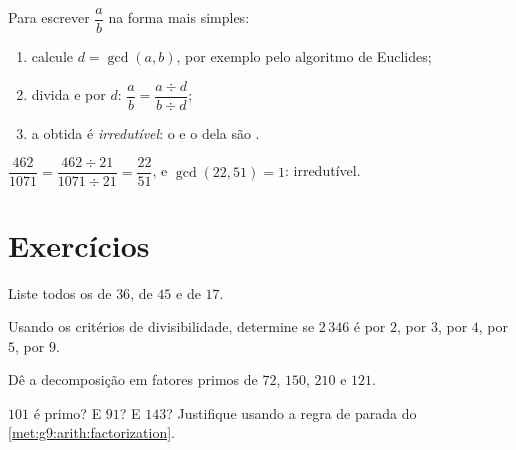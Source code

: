 \begin{method}\label{met:g9:arith:simplify}
Para escrever $\dfrac ab$ na forma mais simples:
\begin{enumerate}
  \item calcule $d = \gcd(a, b)$, por exemplo pelo algoritmo de
        Euclides;
  \item divida  e  por $d$:
        $\dfrac ab = \dfrac{a \div d}{b \div d}$;
  \item a  obtida é \emph{irredutível}: o  e o
         dela são .
\end{enumerate}
\end{method}

\begin{example}
$\dfrac{462}{1071} = \dfrac{462 \div 21}{1071 \div 21} =
\dfrac{22}{51}$, e $\gcd(22, 51) = 1$: irredutível.
\end{example}

\section{Exercícios}

\begin{exercise}[$\star$]\label{exo:g9:arith:1}
Liste todos os  de $36$, de $45$ e de $17$.
\end{exercise}

\begin{exercise}[$\star$]\label{exo:g9:arith:2}
Usando os critérios de divisibilidade, determine se $2\,346$ é
 por $2$, por $3$, por $4$, por $5$, por $9$.
\end{exercise}

\begin{exercise}[$\star$]\label{exo:g9:arith:3}
Dê a decomposição em fatores primos de $72$, $150$, $210$ e $121$.
\end{exercise}

\begin{exercise}[$\star$]\label{exo:g9:arith:4}
$101$ é primo? E $91$? E $143$? Justifique usando a regra de parada do
\cref{met:g9:arith:factorization}.
\end{exercise}

